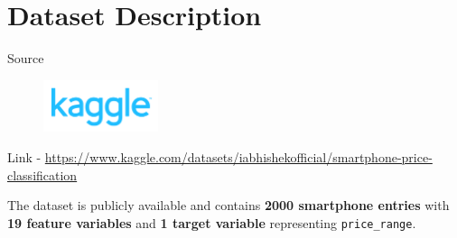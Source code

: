 \documentclass[14pt, aspectratio=169]{beamer}
\begin{document}
\section{Dataset Description}
\begin{frame}{Source}
  \begin{figure}[H]
    \centering
    \includegraphics[width=0.3\textwidth]{kaggle.png}
  \end{figure}
  Link - \footnotesize \href{https://www.kaggle.com/datasets/iabhishekofficial/mobile-price-classification?select=train.csv}{https://www.kaggle.com/datasets/iabhishekofficial/smartphone-price-classification}\\
  \normalsize
  
  The dataset is publicly available and contains \textbf{2000 smartphone entries} with \textbf{19 feature variables} and \textbf{1 target variable} representing \texttt{price\_range}.
\end{frame}
\end{document}
